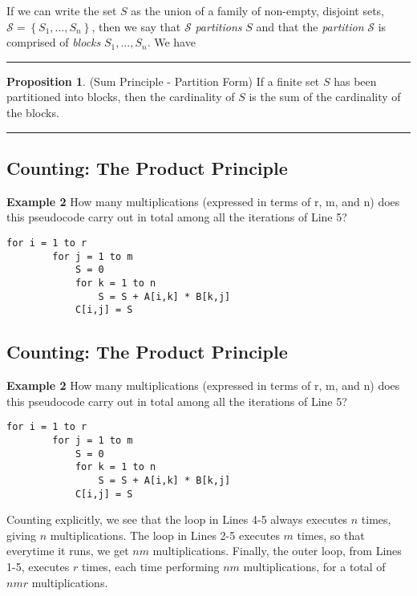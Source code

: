 \documentclass[12pt, letterpaper]{article}
\theoremstyle{definition}
\newtheorem{propt}{Proposition}
\newenvironment{prop}[1]{%
    \vspace*{0.2in}
    \linebreak
    \begin{minipage}{\linewidth}
    \rule{\textwidth}{2pt}
        \begin{propt}
}
{%
        \end{propt}
    \rule{\textwidth}{2pt}
    \end{minipage}
    \vspace*{0.2in}
    \linebreak
}
\begin{document}
If we can write the set $S$ as the union of a family of non-empty, disjoint
sets, $\mathcal{S} = \left\{ S_{1}, ... , S_{n} \right\}$, then we say that
$\mathcal{S}$ \emph{partitions} $S$ and that the \emph{partition} $\mathcal{S}$
is comprised of \emph{blocks} $S_{1}, ... , S_{n}$. We have
\begin{prop}
    \textbf{(Sum Principle - Partition Form)}
    If a finite set $S$ has been partitioned into blocks, then the cardinality of $S$ is
    the sum of the cardinality of the blocks.
\end{prop}

\clearpage\pagebreak\noindent
\subsection*{Counting: The Product Principle}
\noindent
\textbf{Example 2}
How many multiplications (expressed in terms of r, m, and n) does this
pseudocode carry out in total among all the iterations of Line 5?

\begin{center}
    \begin{lstlisting}[label=ex2a, caption={Example 2}]
    for i = 1 to r
        for j = 1 to m
            S = 0
            for k = 1 to n
                S = S + A[i,k] * B[k,j]
            C[i,j] = S
\end{lstlisting}
\end{center}

\clearpage\pagebreak\noindent
\subsection*{Counting: The Product Principle}
\noindent
\textbf{Example 2}
How many multiplications (expressed in terms of r, m, and n) does this
pseudocode carry out in total among all the iterations of Line 5?

\begin{center}
    \begin{lstlisting}[label=ex2b, caption={Example 2}]
    for i = 1 to r
        for j = 1 to m
            S = 0
            for k = 1 to n
                S = S + A[i,k] * B[k,j]
            C[i,j] = S
\end{lstlisting}
\end{center}

\noindent
Counting explicitly, we see that the loop in Lines 4-5 always executes $n$
times, giving $n$ multiplications. The loop in Lines 2-5 executes $m$ times,
so that everytime it runs, we get $nm$ multiplications. Finally, the outer
loop, from Lines 1-5, executes $r$ times, each time performing $nm$
multiplications, for a total of $nmr$ multiplications.
\end{document}
